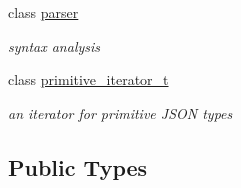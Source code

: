 \begin{DoxyCompactItemize}
class \hyperlink{classnlohmann_1_1basic__json_1_1parser}{parser}
\begin{DoxyCompactList}\small\item\em syntax analysis \end{DoxyCompactList}\item 
class \hyperlink{classnlohmann_1_1basic__json_1_1primitive__iterator__t}{primitive\+\_\+iterator\+\_\+t}
\begin{DoxyCompactList}\small\item\em an iterator for primitive J\+S\+O\+N types \end{DoxyCompactList}\end{DoxyCompactItemize}
\subsection*{Public Types}
